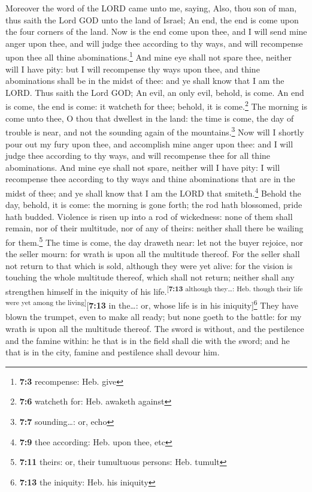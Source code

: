  Moreover the word of the LORD came unto me, saying,
 Also, thou son of man, thus saith the Lord GOD unto the
land of Israel; An end, the end is come upon the four corners of the
land.  Now is the end come upon thee, and I will send mine
anger upon thee, and will judge thee according to thy ways, and will
recompense upon thee all thine abominations.\footnote{\textbf{7:3}
  recompense: Heb. give}  And mine eye shall not spare
thee, neither will I have pity: but I will recompense thy ways upon
thee, and thine abominations shall be in the midst of thee: and ye shall
know that I am the LORD.  Thus saith the Lord GOD; An
evil, an only evil, behold, is come.  An end is come, the
end is come: it watcheth for thee; behold, it is come.\footnote{\textbf{7:6}
  watcheth for: Heb. awaketh against}  The morning is come
unto thee, O thou that dwellest in the land: the time is come, the day
of trouble is near, and not the sounding again of the
mountains.\footnote{\textbf{7:7} sounding\ldots: or, echo}
 Now will I shortly pour out my fury upon thee, and
accomplish mine anger upon thee: and I will judge thee according to thy
ways, and will recompense thee for all thine abominations.
 And mine eye shall not spare, neither will I have pity: I
will recompense thee according to thy ways and thine abominations that
are in the midst of thee; and ye shall know that I am the LORD that
smiteth.\footnote{\textbf{7:9} thee according: Heb. upon thee, etc}
 Behold the day, behold, it is come: the morning is gone
forth; the rod hath blossomed, pride hath budded. 
Violence is risen up into a rod of wickedness: none of them shall
remain, nor of their multitude, nor of any of theirs: neither shall
there be wailing for them.\footnote{\textbf{7:11} theirs: or, their
  tumultuous persons: Heb. tumult}  The time is come, the
day draweth near: let not the buyer rejoice, nor the seller mourn: for
wrath is upon all the multitude thereof.  For the seller
shall not return to that which is sold, although they were yet alive:
for the vision is touching the whole multitude thereof, which shall not
return; neither shall any strengthen himself in the iniquity of his
life.\textsuperscript{{[}\textbf{7:13} although they\ldots: Heb. though
their life were yet among the living{]}}{[}\textbf{7:13} in the\ldots:
or, whose life is in his iniquity{]}\footnote{\textbf{7:13} the
  iniquity: Heb. his iniquity}  They have blown the
trumpet, even to make all ready; but none goeth to the battle: for my
wrath is upon all the multitude thereof.  The sword is
without, and the pestilence and the famine within: he that is in the
field shall die with the sword; and he that is in the city, famine and
pestilence shall devour him.

